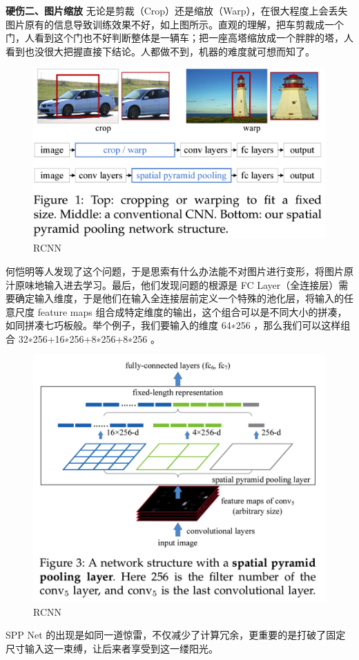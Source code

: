 \textbf{硬伤二、图片缩放}
无论是剪裁（Crop）还是缩放（Warp），在很大程度上会丢失图片原有的信息导致训练效果不好，如上图所示。直观的理解，把车剪裁成一个门，人看到这个门也不好判断整体是一辆车；把一座高塔缩放成一个胖胖的塔，人看到也没很大把握直接下结论。人都做不到，机器的难度就可想而知了。
\begin{figure}[h]
	\centering
	\includegraphics[width=\textwidth]{./Pictures/sppnet_crop_warp.png}	
	\caption{RCNN}
\end{figure}
何恺明等人发现了这个问题，于是思索有什么办法能不对图片进行变形，将图片原汁原味地输入进去学习。最后，他们发现问题的根源是 FC Layer（全连接层）需要确定输入维度，于是他们在输入全连接层前定义一个特殊的池化层，将输入的任意尺度 feature maps 组合成特定维度的输出，这个组合可以是不同大小的拼凑，如同拼凑七巧板般。举个例子，我们要输入的维度 64∗256 ，那么我们可以这样组合 32∗256+16∗256+8∗256+8∗256 。

\begin{figure}[h]
	\centering
	\includegraphics[width=\textwidth]{./Pictures/sppnet_pool_layer.png}	
	\caption{RCNN}
\end{figure}
SPP Net 的出现是如同一道惊雷，不仅减少了计算冗余，更重要的是打破了固定尺寸输入这一束缚，让后来者享受到这一缕阳光。

